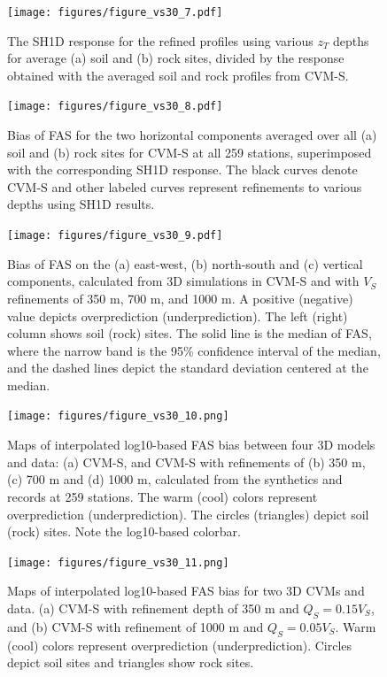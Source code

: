 \clearpage
\begin{figure}[!ht]
  \centering
  \texttt{[image: figures/figure\_vs30\_7.pdf]}
  \caption{The SH1D response for the refined profiles using various $z_T$ depths for average (a) soil and (b) rock sites, divided by the response obtained with the averaged soil and rock profiles from CVM-S.}
  \label{fig:vs30-7}
\end{figure}

\clearpage
\begin{figure}[!ht]
  \centering
  \texttt{[image: figures/figure\_vs30\_8.pdf]}
  \caption{Bias of FAS for the two horizontal components averaged over all (a) soil and (b) rock sites for CVM-S at all 259 stations, superimposed with the corresponding SH1D response. The black curves denote CVM-S and other labeled curves represent refinements to various depths using SH1D results.}
  \label{fig:vs30-8}
\end{figure}

\clearpage
\begin{figure}[!ht]
  \centering
  \texttt{[image: figures/figure\_vs30\_9.pdf]}
  \caption{Bias of FAS on the (a) east-west, (b) north-south and (c) vertical components, calculated from 3D simulations in CVM-S and with $V_S$ refinements of 350 m, 700 m, and 1000 m. A positive (negative) value depicts overprediction (underprediction). The left (right) column shows soil (rock) sites. The solid line is the median of FAS, where the narrow band is the 95\% confidence interval of the median, and the dashed lines depict the standard deviation centered at the median.}
  \label{fig:vs30-9}
\end{figure}

\clearpage
\begin{figure}[!ht]
  \centering
  \texttt{[image: figures/figure\_vs30\_10.png]}
  \caption{Maps of interpolated log10-based FAS bias between four 3D models and data: (a) CVM-S, and CVM-S with refinements of (b) 350 m, (c) 700 m and (d) 1000 m, calculated from the synthetics and records at 259 stations. The warm (cool) colors represent overprediction (underprediction). The circles (triangles) depict soil (rock) sites. Note the log10-based colorbar.}
  \label{fig:vs30-10}
\end{figure}

\clearpage
\begin{figure}[!ht]
  \centering
  \texttt{[image: figures/figure\_vs30\_11.png]}
  \caption{Maps of interpolated log10-based FAS bias for two 3D CVMs and data. (a) CVM-S with refinement depth of 350 m and $Q_S=0.15V_S$, and (b) CVM-S with refinement of 1000 m and $Q_S=0.05V_S$. Warm (cool) colors represent overprediction (underprediction). Circles depict soil sites and triangles show rock sites.}
  \label{fig:vs30-11}
\end{figure}

